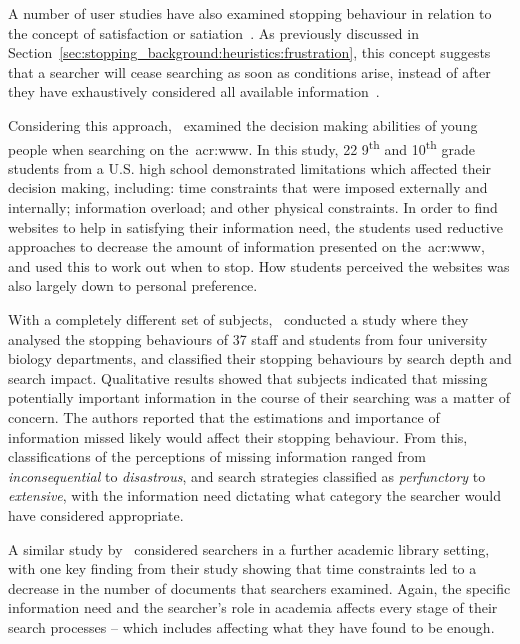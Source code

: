 A number of user studies have also examined stopping behaviour in relation to the concept of satisfaction or satiation~\citep{simon1955satiation}. As previously discussed in Section~\ref{sec:stopping_background:heuristics:frustration}, this concept suggests that a searcher will cease searching as soon as conditions arise, instead of after they have exhaustively considered all available information~\citep{march1994primer}.

Considering this approach,~\cite{agosto2002satisficing} examined the decision making abilities of young people when searching on the~\gls{acr:www}. In this study, 22 9\textsuperscript{th} and 10\textsuperscript{th} grade students from a U.S. high school demonstrated limitations which affected their decision making, including: time constraints that were imposed externally and internally; information overload; and other physical constraints. In order to find websites to help in satisfying their information need, the students used reductive approaches to decrease the amount of information presented on the~\gls{acr:www}, and used this to work out when to stop. How students perceived the websites was also largely down to personal preference.

With a completely different set of subjects,~\cite{mansourian2007search} conducted a study where they analysed the stopping behaviours of 37 staff and students from four university biology departments, and classified their stopping behaviours by search depth and search impact. Qualitative results showed that subjects indicated that missing potentially important information in the course of their searching was a matter of concern. The authors reported that the estimations and importance of information missed likely would affect their stopping behaviour. From this, classifications of the perceptions of missing information ranged from \emph{inconsequential} to \emph{disastrous}, and search strategies classified as \emph{perfunctory} to \emph{extensive}, with the information need dictating what category the searcher would have considered appropriate.

A similar study by~\cite{prabha2007enough} considered searchers in a further academic library setting, with one key finding from their study showing that time constraints led to a decrease in the number of documents that searchers examined. Again, the specific information need and the searcher's role in academia affects every stage of their search processes -- which includes affecting what they have found to be enough.

